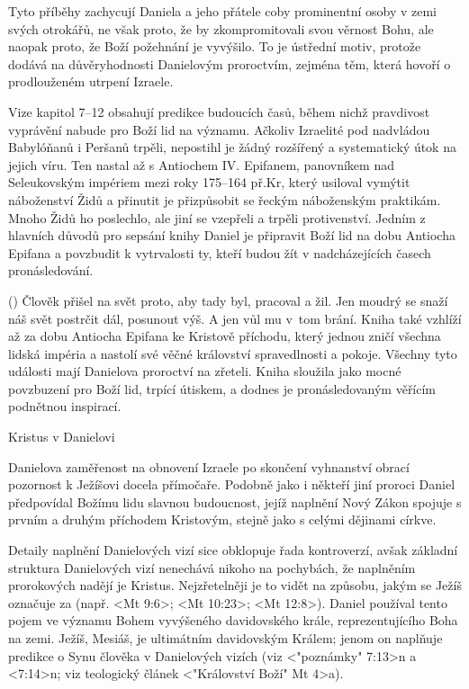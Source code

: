 Tyto příběhy zachycují Daniela a jeho přátele coby prominentní osoby v zemi svých otrokářů, ne však proto, že by zkompromitovali svou věrnost Bohu, ale naopak proto, že Boží požehnání je vyvýšilo.
To je ústřední motiv, protože dodává na důvěryhodnosti Danielovým proroctvím, zejména těm, která hovoří o prodlouženém utrpení Izraele. 

Vize kapitol 7--12 obsahují predikce budoucích časů, během nichž pravdivost vyprávění nabude pro Boží lid na významu.
Ačkoliv Izraelité pod nadvládou Babylóňanů i Peršanů trpěli, nepostihl je žádný rozšířený a systematický útok na jejich víru. Ten nastal až s Antiochem IV. Epifanem, panovníkem nad Seleukovským impériem mezi roky 175--164 př.Kr, který
usiloval vymýtit náboženství Židů a přinutit je přizpůsobit se řeckým náboženským praktikám.
Mnoho Židů ho poslechlo, ale jiní se vzepřeli a trpěli protivenství. 
Jedním z hlavních důvodů pro sepsání knihy Daniel je připravit Boží lid na dobu Antiocha Epifana a povzbudit k vytrvalosti ty, kteří budou žít v nadcházejících časech pronásledování.

 (\kern-2mm) {
   Člověk přišel na svět proto, aby tady byl, pracoval a žil. Jen moudrý se snaží náš svět postrčit dál, posunout výš. A jen vůl mu v~tom brání.
}
Kniha také vzhlíží až za dobu Antiocha Epifana ke Kristově příchodu, který jednou zničí všechna lidská impéria a nastolí své věčné království spravedlnosti a pokoje.
Všechny tyto události mají Danielova proroctví na zřeteli.
Kniha sloužila jako mocné povzbuzení pro Boží lid, trpící útiskem, a dodnes je pronásledovaným věřícím podnětnou inspirací. 

Kristus v Danielovi

Danielova zaměřenost na obnovení Izraele po skončení vyhnanství obrací pozornost k Ježíšovi docela přímočaře.
Podobně jako i někteří jiní proroci Daniel předpovídal Božímu lidu slavnou budoucnost, jejíž naplnění Nový Zákon 
spojuje s prvním a druhým příchodem Kristovým, stejně jako s celými dějinami církve.

Detaily naplnění Danielových vizí sice obklopuje řada kontroverzí, avšak základní struktura Danielových vizí nenechává nikoho na pochybách, že naplněním prorokových nadějí je Kristus.
Nejzřetelněji je to vidět na způsobu, jakým se Ježíš označuje za  (např. <Mt 9:6>; <Mt 10:23>; <Mt 12:8>).
Daniel používal tento pojem ve významu Bohem vyvýšeného davidovského krále, reprezentujícího Boha na zemi.
Ježíš, Mesiáš, je ultimátním davidovským Králem; jenom on naplňuje predikce o Synu člověka v Danielových vizích (viz <"poznámky" 7:13>n a <7:14>n; viz teologický článek 
<"Království Boží"  Mt 4>a). 

